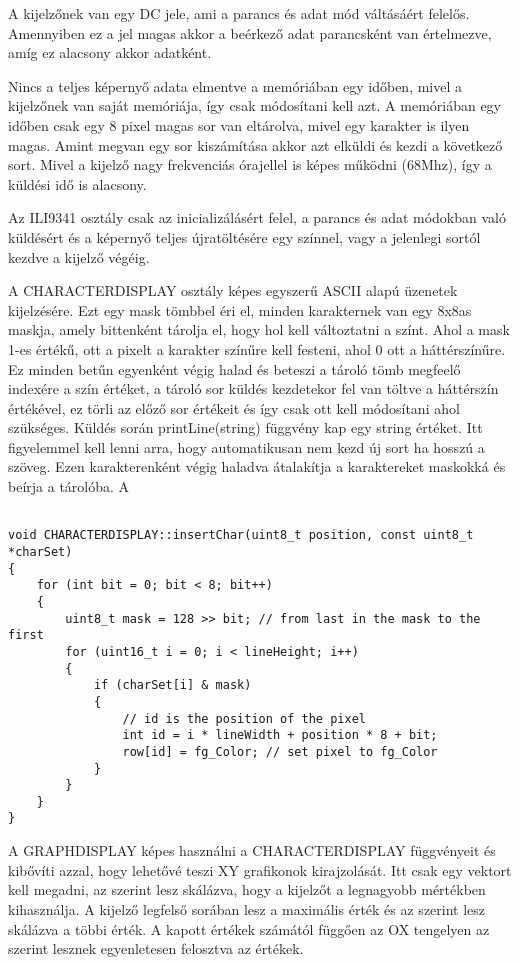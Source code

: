 A kijelzőnek van egy DC jele, ami a parancs és adat mód váltásáért felelős.
Amennyiben ez a jel magas akkor a beérkező adat parancsként van értelmezve, amíg 
ez alacsony akkor adatként.

Nincs a teljes képernyő adata elmentve a memóriában egy időben, mivel a kijelzőnek
van saját memóriája, így csak módosítani kell azt. A memóriában egy időben csak 
egy 8 pixel magas sor van eltárolva, mivel egy karakter is ilyen magas.
Amint megvan egy sor kiszámítása akkor azt elküldi és kezdi a következő sort.
Mivel a kijelző nagy frekvenciás órajellel is képes működni (68Mhz), így a küldési
idő is alacsony.

Az ILI9341 osztály csak az inicializálásért felel, a parancs és adat 
módokban való küldésért és a képernyő teljes újratöltésére egy színnel, vagy a jelenlegi
sortól kezdve a kijelző végéig.

A CHARACTERDISPLAY osztály képes egyszerű ASCII alapú üzenetek kijelzésére.
Ezt egy mask tömbbel éri el, minden karakternek van egy 8x8as maskja, amely
bittenként tárolja el, hogy hol kell változtatni a színt.
Ahol a mask 1-es értékű, ott a pixelt a karakter színűre kell festeni, ahol 0
ott a háttérszínűre.
Ez minden betűn egyenként végig halad és beteszi a tároló tömb megfeelő indexére
a szín értéket, a tároló sor küldés kezdetekor fel van töltve a háttérszín 
értékével, ez törli az előző sor értékeit és így csak ott kell módosítani
ahol szükséges.
Küldés során printLine(string) függvény kap egy string értéket.
Itt figyelemmel kell lenni arra, hogy automatikusan nem kezd új sort
ha hosszú a szöveg. Ezen karakterenként végig haladva átalakítja a karaktereket maskokká
és beírja a tárolóba. A 


\begin{lstlisting}

void CHARACTERDISPLAY::insertChar(uint8_t position, const uint8_t *charSet)
{
    for (int bit = 0; bit < 8; bit++)
    {
        uint8_t mask = 128 >> bit; // from last in the mask to the first
        for (uint16_t i = 0; i < lineHeight; i++)
        {
            if (charSet[i] & mask)
            {
                // id is the position of the pixel
                int id = i * lineWidth + position * 8 + bit;
                row[id] = fg_Color; // set pixel to fg_Color
            }
        }
    }
}

\end{lstlisting}


A GRAPHDISPLAY képes használni a CHARACTERDISPLAY függvényeit és kibővíti azzal,
hogy lehetővé teszi XY grafikonok kirajzolását. Itt csak egy vektort kell megadni,
az szerint lesz skálázva, hogy a kijelzőt a legnagyobb mértékben kihasználja.
A kijelző legfelső sorában lesz a maximális érték és az szerint lesz skálázva a
többi érték. A kapott értékek számától függően az OX tengelyen az szerint lesznek
egyenletesen felosztva az értékek.


